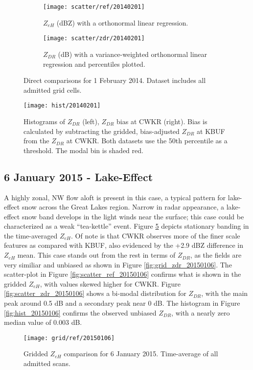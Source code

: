 \begin{figure}[H]
\centering
   \begin{subfigure}[t]{0.48\linewidth} \centering
     \texttt{[image: scatter/ref/20140201]}
     \caption{$Z_{eH}$ (dBZ) with a orthonormal linear regression.}\label{fig:scatter_ref_20140201}
   \end{subfigure}
   \begin{subfigure}[t]{0.48\linewidth} \centering
     \texttt{[image: scatter/zdr/20140201]}
     \caption{$Z_{DR}$ (dB) with a variance-weighted orthonormal linear regression and percentiles plotted.}\label{fig:scatter_zdr_20140201}
   \end{subfigure}
\caption{Direct comparisons for 1 February 2014. Dataset includes all admitted grid cells.} \label{fig:scatter_20140201}
\end{figure}

\begin{figure}[H]
\texttt{[image: hist/20140201]}\centering
\caption{Histograms of $Z_{DR}$ (left), $Z_{DR}$ bias at CWKR (right). Bias is calculated by subtracting the gridded, bias-adjusted $Z_{DR}$ at KBUF from the
$Z_{DR}$ at CWKR. Both datasets use the 50th percentile as a threshold. The modal bin is shaded red.} 
\label{fig:hist_20140201}
\end{figure}

\subsection{6 January 2015 - Lake-Effect}
A highly zonal, NW flow aloft is present in this case, a typical pattern for lake-effect snow across the Great Lakes region. Narrow in radar appearance, a
lake-effect snow band develops in the light winds near the surface; this case could be characterized as a weak ``tea-kettle'' event. Figure
\ref{fig:grid_ref_20150106} depicts stationary banding in the time-averaged $Z_{eH}$. Of note is that CWKR observes more of the finer scale features as
compared with KBUF, also evidenced by the +2.9 dBZ difference in $Z_{eH}$ mean. 
This case stands out from the rest in terms of $Z_{DR}$, as the fields are
very similiar and unbiased as shown in Figure \ref{fig:grid_zdr_20150106}. The scatter-plot in Figure
\ref{fig:scatter_ref_20150106} confirms what is shown in the gridded $Z_{eH}$, with values skewed higher for CWKR. Figure \ref{fig:scatter_zdr_20150106}
shows a bi-modal distribution for $Z_{DR}$, with the
main peak around 0.5 dB and a secondary peak near 0 dB. The histogram in Figure
\ref{fig:hist_20150106} confirms the observed unbiased $Z_{DR}$, with a nearly zero median value of 0.003 dB.
\begin{figure}[H]
\texttt{[image: grid/ref/20150106]}
\caption{Gridded $Z_{eH}$ comparison for 6 January 2015. Time-average of all admitted scans.} 
\label{fig:grid_ref_20150106}
\end{figure}


